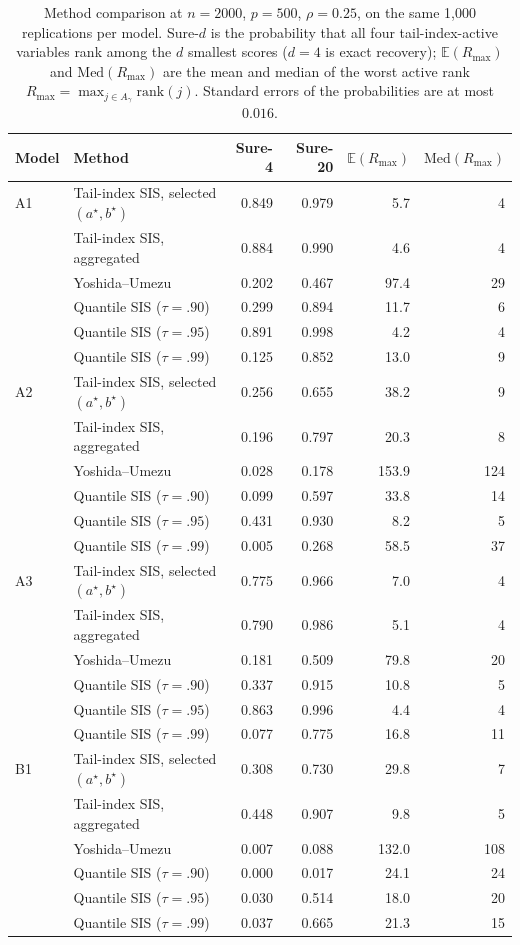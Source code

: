 \documentclass[bj,authoryear]{imsart}
\theoremstyle{plain}
\newcommand{\A}{A}\newcommand{\I}{I_\varepsilon}
\begin{document}
\begin{table}[t]
\centering
\caption{Method comparison at $n=2000$, $p=500$, $\rho=0.25$, on the same 1{,}000 replications per model. Sure-$d$ is the probability that all four tail-index-active variables rank among the $d$ smallest scores ($d=4$ is exact recovery); $\mathbb{E}(R_{\max})$ and $\mathrm{Med}(R_{\max})$ are the mean and median of the worst active rank $R_{\max}=\max_{j\in\A_\gamma}\mathrm{rank}(j)$. Standard errors of the probabilities are at most $0.016$.}
\label{tab:cmp500}
\begin{tabular}{llrrrr}
\toprule
Model & Method & Sure-4 & Sure-20 & $\mathbb{E}(R_{\max})$ & $\mathrm{Med}(R_{\max})$\\
\midrule
A1 & Tail-index SIS, selected $(a^\star,b^\star)$ & 0.849 & 0.979 & 5.7 & 4\\
 & Tail-index SIS, aggregated & 0.884 & 0.990 & 4.6 & 4\\
 & Yoshida--Umezu & 0.202 & 0.467 & 97.4 & 29\\
 & Quantile SIS ($\tau=.90$) & 0.299 & 0.894 & 11.7 & 6\\
 & Quantile SIS ($\tau=.95$) & 0.891 & 0.998 & 4.2 & 4\\
 & Quantile SIS ($\tau=.99$) & 0.125 & 0.852 & 13.0 & 9\\
\addlinespace
A2 & Tail-index SIS, selected $(a^\star,b^\star)$ & 0.256 & 0.655 & 38.2 & 9\\
 & Tail-index SIS, aggregated & 0.196 & 0.797 & 20.3 & 8\\
 & Yoshida--Umezu & 0.028 & 0.178 & 153.9 & 124\\
 & Quantile SIS ($\tau=.90$) & 0.099 & 0.597 & 33.8 & 14\\
 & Quantile SIS ($\tau=.95$) & 0.431 & 0.930 & 8.2 & 5\\
 & Quantile SIS ($\tau=.99$) & 0.005 & 0.268 & 58.5 & 37\\
\addlinespace
A3 & Tail-index SIS, selected $(a^\star,b^\star)$ & 0.775 & 0.966 & 7.0 & 4\\
 & Tail-index SIS, aggregated & 0.790 & 0.986 & 5.1 & 4\\
 & Yoshida--Umezu & 0.181 & 0.509 & 79.8 & 20\\
 & Quantile SIS ($\tau=.90$) & 0.337 & 0.915 & 10.8 & 5\\
 & Quantile SIS ($\tau=.95$) & 0.863 & 0.996 & 4.4 & 4\\
 & Quantile SIS ($\tau=.99$) & 0.077 & 0.775 & 16.8 & 11\\
\addlinespace
B1 & Tail-index SIS, selected $(a^\star,b^\star)$ & 0.308 & 0.730 & 29.8 & 7\\
 & Tail-index SIS, aggregated & 0.448 & 0.907 & 9.8 & 5\\
 & Yoshida--Umezu & 0.007 & 0.088 & 132.0 & 108\\
 & Quantile SIS ($\tau=.90$) & 0.000 & 0.017 & 24.1 & 24\\
 & Quantile SIS ($\tau=.95$) & 0.030 & 0.514 & 18.0 & 20\\
 & Quantile SIS ($\tau=.99$) & 0.037 & 0.665 & 21.3 & 15\\
\bottomrule
\end{tabular}
\end{table}
\end{document}
